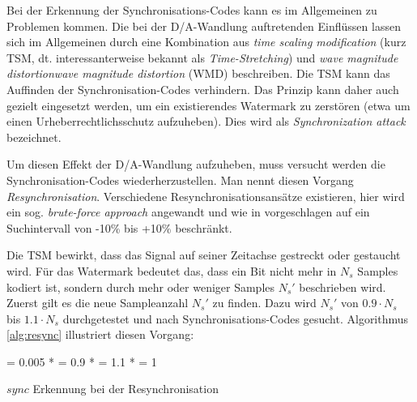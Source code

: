 Bei der Erkennung der Synchronisations-Codes kann es im Allgemeinen zu Problemen kommen. Die bei der D/A-Wandlung auftretenden Einflüssen lassen sich im Allgemeinen durch eine Kombination aus \textit{time scaling modification} (kurz TSM, dt. interessanterweise bekannt als \textit{Time-Stretching}) und \textit{wave magnitude
distortion}\textit{wave magnitude
distortion} (WMD) beschreiben\cite{xiang2007robust}\cite{steinebach2002audio}. Die TSM kann das Auffinden der Synchronisation-Codes verhindern. Das Prinzip kann daher auch gezielt eingesetzt werden, um ein existierendes Watermark zu zerstören (etwa um einen Urheberrechtlichsschutz aufzuheben). Dies wird als \textit{Synchronization attack} bezeichnet.

Um diesen Effekt der D/A-Wandlung aufzuheben, muss versucht werden die Synchronisation-Codes wiederherzustellen. Man nennt diesen Vorgang \textit{Resynchronisation}. Verschiedene Resynchronisationsansätze existieren, hier wird ein sog. \textit{brute-force approach} angewandt und wie in \cite{steinebach2011re} vorgeschlagen auf ein Suchintervall von -10\% bis +10\% beschränkt. 

Die TSM bewirkt, dass das Signal auf seiner Zeitachse gestreckt oder gestaucht wird. Für das Watermark bedeutet das, dass ein Bit nicht mehr in $N_s$ Samples kodiert ist, sondern durch mehr oder weniger Samples ${N}_{s}'$ beschrieben wird. 
Zuerst gilt es die neue Sampleanzahl ${N}_{s}'$ zu finden. Dazu wird ${N}_{s}'$ von $0.9 \cdot {N}_{s}$ bis $1.1 \cdot {N}_{s}$ durchgetestet und nach Synchronisations-Codes gesucht. Algorithmus \ref{alg:resync} illustriert diesen Vorgang:

\begin{algorithm}[h]


\BlankLine

\Steplen = 0.005 * \Ns\;
\Lowerbound = 0.9 * \Ns\;
\Upperbound = 1.1 * \Ns\;
\Cursor = 1\;


\caption{$sync$ Erkennung bei der Resynchronisation}
\label{alg:resync}
\end{algorithm}

